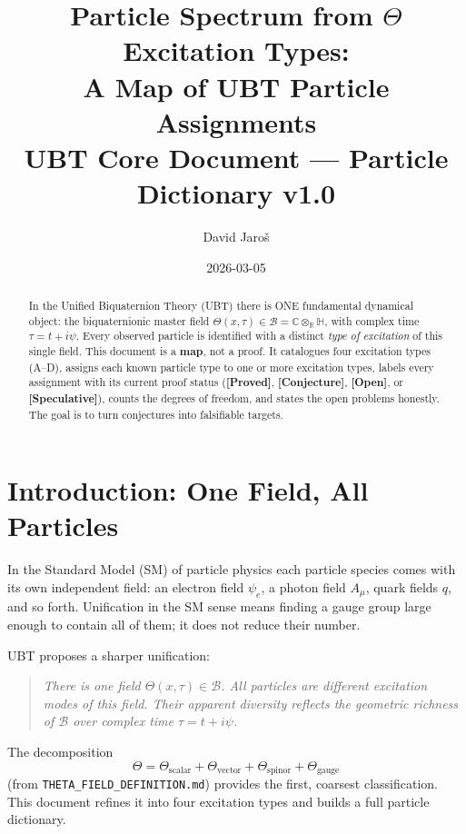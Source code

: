 \documentclass[12pt,a4paper]{article}
\title{%
  Particle Spectrum from $\Theta$ Excitation Types:\\
  A Map of UBT Particle Assignments\\[0.5ex]
  \large UBT Core Document --- Particle Dictionary v1.0
}
\author{David Jaro\v{s}}
\date{2026-03-05}
\theoremstyle{remark}
\newcommand{\B}{\mathcal{B}}
\newcommand{\C}{\mathbb{C}}
\newcommand{\R}{\mathbb{R}}
\newcommand{\H}{\mathbb{H}}
\newcommand{\proved}{\textbf{[Proved]}}
\newcommand{\conjecture}{\textbf{[Conjecture]}}
\newcommand{\openq}{\textbf{[Open]}}
\newcommand{\speculative}{\textbf{[Speculative]}}
\begin{document}
\maketitle

\begin{abstract}
In the Unified Biquaternion Theory (UBT) there is ONE fundamental dynamical
object: the biquaternionic master field
$\Theta(x,\tau)\in\B = \C\otimes_\R\H$, with complex time
$\tau = t + i\psi$.  Every observed particle is identified with a distinct
\emph{type of excitation} of this single field.  This document is a
\textbf{map}, not a proof.  It catalogues four excitation types (A--D),
assigns each known particle type to one or more excitation types, labels
every assignment with its current proof status (\proved, \conjecture,
\openq, or \speculative), counts the degrees of freedom, and states the
open problems honestly.  The goal is to turn conjectures into falsifiable
targets.
\end{abstract}

\tableofcontents

\section{Introduction: One Field, All Particles}
\label{sec:intro}

In the Standard Model (SM) of particle physics each particle species comes
with its own independent field: an electron field $\psi_e$, a photon field
$A_\mu$, quark fields $q$, and so forth.  Unification in the SM sense means
finding a gauge group large enough to contain all of them; it does not reduce
their number.

UBT proposes a sharper unification:

\begin{quote}
\emph{There is one field $\Theta(x,\tau)\in\B$.  All particles are different
excitation modes of this field.  Their apparent diversity reflects the
geometric richness of $\B$ over complex time $\tau = t+i\psi$.}
\end{quote}

The decomposition
\begin{equation}
  \Theta = \Theta_{\text{scalar}} + \Theta_{\text{vector}}
           + \Theta_{\text{spinor}} + \Theta_{\text{gauge}}
  \label{eq:decomp}
\end{equation}
(from \texttt{THETA\_FIELD\_DEFINITION.md}) provides the first, coarsest
classification.  This document refines it into four excitation types and
builds a full particle dictionary.
\end{document}
